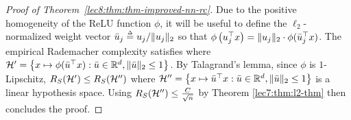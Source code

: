 \begin{proof}[Proof of Theorem~\ref{lec8:thm:thm-improved-nn-rc}]
Due to the positive homogeneity of the ReLU function $\phi$, it will be useful to define the $\ell_2$-normalized weight vector $\bar{u}_j \defeq u_j / \norm{u_j}_2$ so that $\phi\left(u_j^\top x\right) = \|u_j\|_2 \cdot \phi(\bar{u}_j^\top x)$. The empirical Rademacher complexity satisfies
\allowdisplaybreaks
{}
where $\mathcal H' = \left\{x \mapsto \phi(\bar{u}^\top x) :  \bar{u} \in \mathbb{R}^d, \|\bar{u}\|_2 \leq 1 \right\}$. By Talagrand's lemma, since $\phi$ is $1$-Lipschitz, $R_S(\mathcal H') \leq R_S(\mathcal H'')$ where  $\mathcal H'' = \left\{x \mapsto \bar{u}^\top x :  \bar{u} \in \mathbb{R}^d, \|\bar{u}\|_2 \leq 1 \right\}$ is a linear hypothesis space. Using $R_S(\mathcal H'') \leq \frac{C}{\sqrt{n}}$ by Theorem \ref{lec7:thm:l2-thm} then concludes the proof.

\end{proof}

